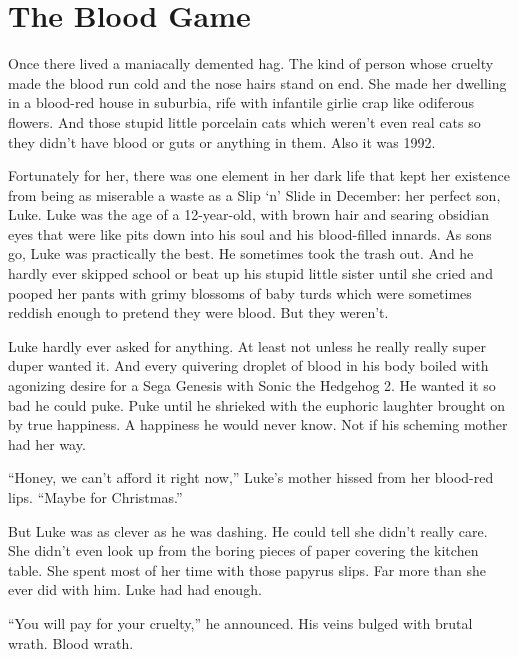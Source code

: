 \chapter{The Blood Game}


Once there lived a maniacally demented hag. The kind of person
whose cruelty made the blood run cold and the nose hairs stand on
end. She made her dwelling in a blood-red house in suburbia, rife
with infantile girlie crap like odiferous flowers. And those stupid
little porcelain cats which weren't even real cats so they
didn't have blood or guts or anything in them. Also it was
1992.



Fortunately for her, there was one element in her dark life that
kept her existence from being as miserable a waste as a Slip
`n' Slide in December: her perfect son, Luke. Luke was
the age of a 12-year-old, with brown hair and searing obsidian eyes
that were like pits down into his soul and his blood-filled
innards. As sons go, Luke was practically the best. He sometimes
took the trash out. And he hardly ever skipped school or beat up
his stupid little sister until she cried and pooped her pants with
grimy blossoms of baby turds which were sometimes reddish enough to
pretend they were blood. But they weren't.



Luke hardly ever asked for anything. At least not unless he really
really super duper wanted it. And every quivering droplet of blood
in his body boiled with agonizing desire for a Sega Genesis with
Sonic the Hedgehog 2. He wanted it so bad he could puke. Puke until
he shrieked with the euphoric laughter brought on by true
happiness. A happiness he would never know. Not if his scheming
mother had her way.



``Honey, we can't afford it right now,''
Luke's mother hissed from her blood-red lips. ``Maybe
for Christmas.''



But Luke was as clever as he was dashing. He could tell she
didn't really care. She didn't even look up from the
boring pieces of paper covering the kitchen table. She spent most
of her time with those papyrus slips. Far more than she ever did
with him. Luke had had enough.



``You will pay for your cruelty,'' he announced. His
veins bulged with brutal wrath. Blood wrath.



